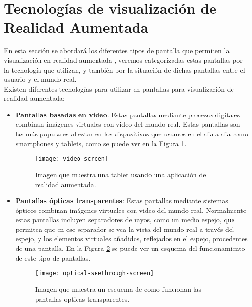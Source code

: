 \section{Tecnologías de visualización de Realidad Aumentada}
En esta sección se abordará los diferentes tipos de pantalla que permiten la visualización en realidad aumentada \cite{billinghurst}, veremos categorizadas estas pantallas por la tecnología que utilizan, y también por la situación de dichas pantallas entre el usuario y el mundo real.\\

Existen diferentes tecnologías para utilizar en pantallas para visualización de realidad aumentada:
\begin{itemize}
  \item \textbf{Pantallas basadas en video}: Estas pantallas mediante procesos digitales combinan imágenes virtuales con video del mundo real. Estas pantallas son las más populares al estar en los dispositivos que usamos en el dia a dia como smartphones y tablets, como se puede ver en la Figura \ref{figura-pantalla-video}.

  \begin{figure}[h]
    \centering
    \texttt{[image: video-screen]}
    \caption{Imagen que muestra una tablet usando una aplicación de realidad aumentada.\protect\footnotemark}
    \label{figura-pantalla-video}
  \end{figure}


  \newpage

  \item \textbf{Pantallas ópticas transparentes}: Estas pantallas mediante sistemas ópticos combinan imágenes virtuales con video del mundo real. Normalmente estas pantallas incluyen separadores de rayos, como un medio espejo, que permiten que en ese separador se vea la vista del mundo real a través del espejo, y los elementos virtuales añadidos, reflejados en el espejo, procedentes de una pantalla. En la Figura \ref{figura-pantalla-optica} se puede ver un esquema del funcionamiento de este tipo de pantallas.

  \begin{figure}[h]
    \centering
    \texttt{[image: optical-seethrough-screen]}
    \caption{Imagen que muestra un esquema de como funcionan las pantallas opticas transparentes.\protect\footnotemark}
    \label{figura-pantalla-optica}
  \end{figure}


\end{itemize}
